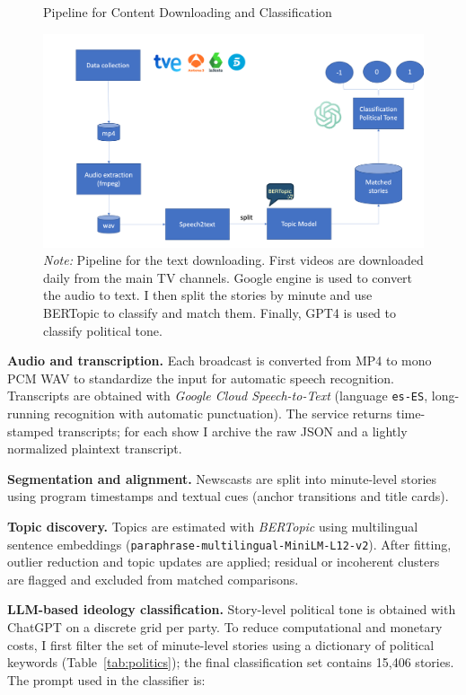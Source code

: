 \documentclass[12pt]{article}
\begin{document}
\begin{figure}[!htb]
	\centering
	\caption{Pipeline for Content Downloading and Classification }
	\includegraphics[width=150mm]{figures/pipeline3}
	\caption*{\small \textit{Note:} Pipeline for the text downloading. First videos are downloaded daily from the main TV channels. Google engine is used to convert the audio to text. I then split the stories by minute and use BERTopic to classify and match them. Finally, GPT4 is used to classify political tone.}
	\label{fig:pipeline}
\end{figure}



\textbf{Audio and transcription.} Each broadcast is converted from MP4 to mono PCM WAV to standardize the input for automatic speech recognition. Transcripts are obtained with \emph{Google Cloud Speech-to-Text} (language \texttt{es-ES}, long-running recognition with automatic punctuation). The service returns time-stamped transcripts; for each show I archive the raw JSON and a lightly normalized plaintext transcript.

\textbf{Segmentation and alignment.} Newscasts are split into minute-level stories using program timestamps and textual cues (anchor transitions and title cards). 

\textbf{Topic discovery.} Topics are estimated with \emph{BERTopic} using multilingual sentence embeddings (\texttt{paraphrase-multilingual-MiniLM-L12-v2}). After fitting, outlier reduction and topic updates are applied; residual or incoherent clusters are flagged and excluded from matched comparisons.

\textbf{LLM-based ideology classification.} Story-level political tone is obtained with ChatGPT on a discrete grid per party. To reduce computational and monetary costs, I first filter the set of minute-level stories using a dictionary of political keywords (Table~\ref{tab:politics}); the final classification set contains 15{,}406 stories. The prompt used in the classifier is:
\end{document}
